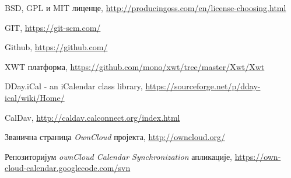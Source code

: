 %
%
\begin{thebibliography}{11}
 {BSD, GPL и MIT лиценце, \url{http://producingoss.com/en/license-choosing.html}}

 {GIT, \url{https://git-scm.com/}}

 {Github, \url{https://github.com/}}

 {XWT платформа, \url{https://github.com/mono/xwt/tree/master/Xwt/Xwt}}

 {DDay.iCal - an iCalendar class library, \url{https://sourceforge.net/p/dday-ical/wiki/Home/}}

 {CalDav, \url{http://caldav.calconnect.org/index.html}}

 {Званична страница {\it OwnCloud} пројекта, \url{http://owncloud.org/}}

 {Репозиторијум {\it ownCloud Calendar Synchronization} апликације, \url{https://own-cloud-calendar.googlecode.com/svn}}

\end{thebibliography}

